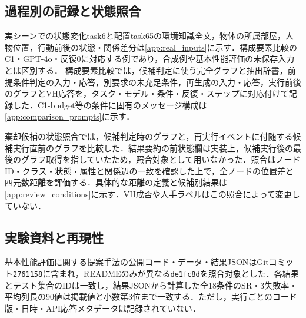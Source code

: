 





\subsection{過程別の記録と状態照合}\label{app:evidence}
実シーンでの状態変化task6と配置task65の環境知識全文，物体の所属部屋，人物位置，行動前後の状態・関係差分は\ref{app:real_inputs}に示す．構成要素比較のC1・GPT-4o・反復0に対応する例であり，合成例や基本性能評価の未保存入力とは区別する．
構成要素比較では，候補判定に使う完全グラフと抽出辞書，前提条件判定の入力・応答，別要求の未充足条件，再生成の入力・応答，実行前後のグラフとVH応答を，タスク・モデル・条件・反復・ステップに対応付けて記録した．C1-budget等の条件に固有のメッセージ構成は\ref{app:comparison_prompts}に示す．

棄却候補の状態照合では，候補判定時のグラフと，再実行イベントに付随する候補実行直前のグラフを比較した．結果要約の前状態欄は実装上，候補実行後の最後のグラフ取得を指していたため，照合対象として用いなかった．照合はノードID・クラス・状態・属性と関係辺の一致を確認した上で，全ノードの位置差と四元数距離を評価する．具体的な距離の定義と候補別結果は\ref{app:review_conditions}に示す．VH成否や人手ラベルはこの照合によって変更していない．

\subsection{実験資料と再現性}\label{app:reproducibility}
基本性能評価に関する提案手法の公開コード・データ・結果JSONはGitコミット\texttt{2761158}に含まれ，READMEのみが異なる\texttt{de1fc8d}を照合対象とした．各結果とテスト集合のIDは一致し，結果JSONから計算した全18条件のSR・3失敗率・平均列長の90値は掲載値と小数第3位まで一致する．ただし，実行ごとのコード版・日時・API応答メタデータは記録されていない．

